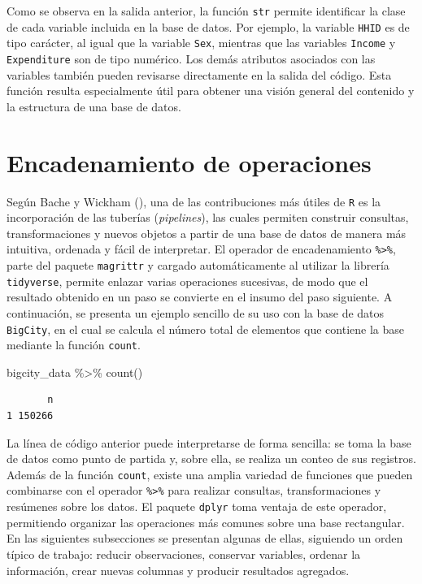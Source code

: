 \documentclass[
  spanish,
  11pt,
  letterpaper,
  oneside,
  open=any]{scrbook}
\newenvironment{Shaded}{\begin{snugshade}}{\end{snugshade}}
\newcommand{\FunctionTok}[1]{\textcolor[rgb]{0.28,0.35,0.67}{#1}}
\newcommand{\NormalTok}[1]{\textcolor[rgb]{0.00,0.23,0.31}{#1}}
\newcommand{\SpecialCharTok}[1]{\textcolor[rgb]{0.37,0.37,0.37}{#1}}
\begin{document}
Como se observa en la salida anterior, la función \texttt{str} permite
identificar la clase de cada variable incluida en la base de datos. Por
ejemplo, la variable \texttt{HHID} es de tipo carácter, al igual que la
variable \texttt{Sex}, mientras que las variables \texttt{Income} y
\texttt{Expenditure} son de tipo numérico. Los demás atributos asociados
con las variables también pueden revisarse directamente en la salida del
código. Esta función resulta especialmente útil para obtener una visión
general del contenido y la estructura de una base de datos.

\section{Encadenamiento de
operaciones}\label{encadenamiento-de-operaciones}

Según Bache y Wickham (), una de las
contribuciones más útiles de \texttt{R} es la incorporación de las
tuberías (\emph{pipelines}), las cuales permiten construir consultas,
transformaciones y nuevos objetos a partir de una base de datos de
manera más intuitiva, ordenada y fácil de interpretar. El operador de
encadenamiento \texttt{\%\textgreater{}\%}, parte del paquete
\texttt{magrittr} y cargado automáticamente al utilizar la librería
\texttt{tidyverse}, permite enlazar varias operaciones sucesivas, de
modo que el resultado obtenido en un paso se convierte en el insumo del
paso siguiente. A continuación, se presenta un ejemplo sencillo de su
uso con la base de datos \texttt{BigCity}, en el cual se calcula el
número total de elementos que contiene la base mediante la función
\texttt{count}.

\begin{Shaded}
\begin{Highlighting}[]
\NormalTok{bigcity\_data }\SpecialCharTok{\%\textgreater{}\%}
  \FunctionTok{count}\NormalTok{()}
\end{Highlighting}
\end{Shaded}

\begin{verbatim}
       n
1 150266
\end{verbatim}

La línea de código anterior puede interpretarse de forma sencilla: se
toma la base de datos como punto de partida y, sobre ella, se realiza un
conteo de sus registros. Además de la función \texttt{count}, existe una
amplia variedad de funciones que pueden combinarse con el operador
\texttt{\%\textgreater{}\%} para realizar consultas, transformaciones y
resúmenes sobre los datos. El paquete \texttt{dplyr} toma ventaja de
este operador, permitiendo organizar las operaciones más comunes sobre
una base rectangular. En las siguientes subsecciones se presentan
algunas de ellas, siguiendo un orden típico de trabajo: reducir
observaciones, conservar variables, ordenar la información, crear nuevas
columnas y producir resultados agregados.
\end{document}
